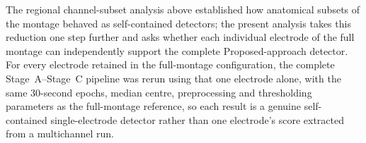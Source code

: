 The regional channel-subset analysis above established how anatomical subsets of the montage behaved as self-contained detectors; the present analysis takes this reduction one step further and asks whether each individual electrode of the full montage can independently support the complete Proposed-approach detector. For every electrode retained in the full-montage configuration, the complete Stage~A--Stage~C pipeline was rerun using that one electrode alone, with the same 30-second epochs, median centre, preprocessing and thresholding parameters as the full-montage reference, so each result is a genuine self-contained single-electrode detector rather than one electrode's score extracted from a multichannel run.

